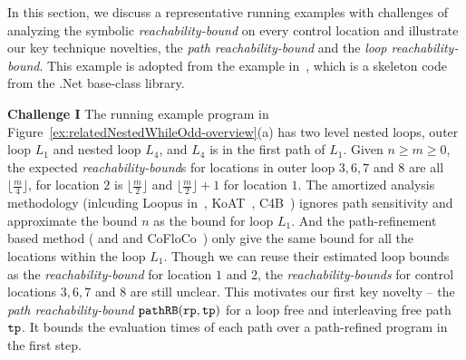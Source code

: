 In this section, we discuss a representative running examples with
challenges of analyzing the symbolic
\emph{reachability-bound} on
every control location and illustrate our key technique novelties, the \emph{path reachability-bound} and the \emph{loop reachability-bound}.
This example is adopted from the example in~\cite{GulwaniZ10}, which
is a skeleton code from the .Net base-class library.


\textbf{Challenge I}
The running example program in Figure~\ref{ex:relatedNestedWhileOdd-overview}(a) has two level nested loops, outer loop $L_1$ and nested loop $L_4$, and $L_4$ is in the first path of $L_1$. Given $n \geq m \geq 0$,
the expected \emph{reachability-bound}s for locations in outer loop $3, 6, 7$ and $8$ are all $\lfloor\frac{m}{4}\rfloor$,
for location $2$ is $\lfloor\frac{m}{2}\rfloor$ and $\lfloor\frac{m}{2}\rfloor + 1$ for location $1$.
The amortized analysis methodology (inlcuding Loopus in~\cite{SinnZV17}, KoAT~\cite{BrockschmidtEFFG14,FalkeKS12,FalkeKS11}, C4B~\cite{CarbonneauxHS15}) ignores path sensitivity and approximate the bound $n$ as the bound for loop $L_1$. 
And the path-refinement based method (\cite{GulwaniZ10} and \cite{GulwaniJK09} and CoFloCo~\cite{Montoya17,Flores-Montoya16,Flores-MontoyaH14}) only give the same bound for all the locations within the loop $L_1$. 
Though we can reuse their estimated loop bounds as the \emph{reachability-bound} for location $1$ and $2$,
the \emph{reachability-bounds} for control locations $3, 6, 7$ and $8$ are still unclear.
%
This motivates our first key novelty -- the \emph{path reachability-bound} $\mathtt{pathRB}(\mathtt{rp}, \mathtt{tp})$ for a loop free and interleaving free path $\mathtt{tp}$.
It bounds the evaluation times of each path over a path-refined program in the first step.

